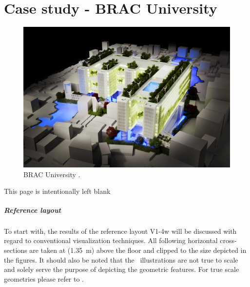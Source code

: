 
\chapter{Case study - BRAC University}
\label{chap:case_study_BRAC_U}


\blindtext[2]



\begin{figure}[hbt]
	\centering
	\includegraphics[width=0.9\linewidth]{images/BRAC_Model}
	\caption[BRAC University]{BRAC University \citep{WOHA}.}
	\label{fig:bracmodel}
\end{figure}





\clearpage

\thispagestyle{empty}
\vspace*{\fill}
\begin{center}
\sffamily This page is intentionally left blank
\end{center}
\vspace*{\fill}


\clearpage

\paragraph{Reference layout}

To start with, the results of the reference layout V1-4w will be discussed with regard to conventional visualization techniques.
All following horizontal cross-sections are taken at (\SI{1.35}{\metre}) above the floor and clipped to the size depicted in the figures. It should  also be noted that the \ACR\ illustrations are not true to scale and solely serve the purpose of depicting the geometric features. For true scale geometries please refer to .

